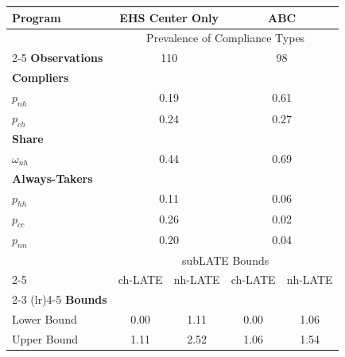 \begin{tabular}{lcccc}
\toprule 
\midrule 
Program & \multicolumn{2}{c}{EHS Center Only} & \multicolumn{2}{c}{ABC} \\
\midrule 
 & \multicolumn{4}{c}{Prevalence of Compliance Types} \\
 \cmidrule(lr){2-5} 
\textbf{Observations} & \multicolumn{2}{c}{110} & \multicolumn{2}{c}{98} \\
\textbf{Compliers} \\
\quad $p_{nh}$ & \multicolumn{2}{c}{0.19} & \multicolumn{2}{c}{0.61} \\
\quad $p_{ch}$ & \multicolumn{2}{c}{0.24} & \multicolumn{2}{c}{0.27} \\
\textbf{Share} \\
\quad $\omega_{nh}$ & \multicolumn{2}{c}{0.44} & \multicolumn{2}{c}{0.69} \\
\textbf{Always-Takers} \\
\quad $p_{hh}$ & \multicolumn{2}{c}{0.11} & \multicolumn{2}{c}{0.06} \\
\quad $p_{cc}$ & \multicolumn{2}{c}{0.26} & \multicolumn{2}{c}{0.02} \\
\quad $p_{nn}$ & \multicolumn{2}{c}{0.20} & \multicolumn{2}{c}{0.04} \\
\midrule 
 & \multicolumn{4}{c}{subLATE Bounds} \\
 \cmidrule(lr){2-5} 
 & ch-LATE & nh-LATE & ch-LATE & nh-LATE \\
 \cmidrule(lr){2-3} \cmidrule(lr){4-5} 
\textbf{Bounds} \\
\quad Lower Bound & 0.00 & 1.11 & 0.00 & 1.06 \\
\quad Upper Bound & 1.11 & 2.52 & 1.06 & 1.54 \\
\midrule 
\bottomrule 
\end{tabular}
